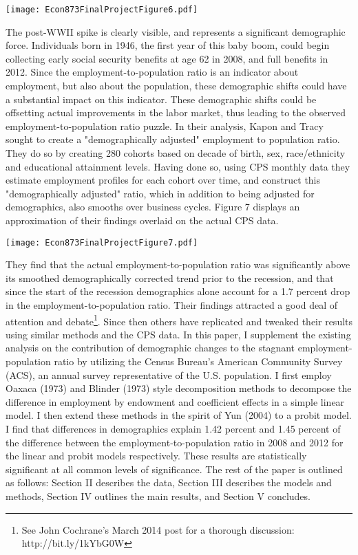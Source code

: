 \documentclass[11pt]{article}
\theoremstyle{definition}
\begin{document}
\begin{center}
\texttt{[image: Econ873FinalProjectFigure6.pdf]}
\end{center}

The post-WWII spike is clearly visible, and represents a significant demographic force.  Individuals born in 1946, the first year of this baby boom, could begin collecting early social security benefits at age 62 in 2008, and full benefits in 2012.  Since the employment-to-population ratio is an indicator about employment, but also about the population, these demographic shifts could have a substantial impact on this indicator.  These demographic shifts could be offsetting actual improvements in the labor market, thus leading to the observed employment-to-population ratio puzzle.  In their analysis, Kapon and Tracy sought to create a "demographically adjusted" employment to population ratio.  They do so by creating 280 cohorts based on decade of birth, sex, race/ethnicity and educational attainment levels.  Having done so, using CPS monthly data they estimate employment profiles for each cohort over time, and construct this "demographically adjusted" ratio, which in addition to being adjusted for demographics, also smooths over business cycles.  Figure 7 displays an approximation of their findings overlaid on the actual CPS data.  

\begin{center}
\texttt{[image: Econ873FinalProjectFigure7.pdf]}
\end{center}

They find that the actual employment-to-population ratio was significantly above its smoothed demographically corrected trend prior to the recession, and that since the start of the recession demographics alone account for a 1.7 percent drop in the employment-to-population ratio.  Their findings attracted a good deal of attention and debate\footnote{See John Cochrane's March 2014 post for a thorough discussion: http://bit.ly/1kYbG0W}.  Since then others have replicated and tweaked their results using similar methods and the CPS data.  In this paper, I supplement the existing analysis on the contribution of demographic changes to the stagnant employment-population ratio by utilizing the Census Bureau's American Community Survey (ACS), an annual survey representative of the U.S. population.  I first employ Oaxaca (1973) and Blinder (1973) style decomposition methods to decompose the difference in employment by endowment and coefficient effects in a simple linear model.  I then extend these methods in the spirit of Yun (2004) to a probit model.  I find that differences in demographics explain 1.42 percent and 1.45 percent of the difference between the employment-to-population ratio in 2008 and 2012 for the linear and probit models respectively.  These results are statistically significant at all common levels of significance.  The rest of the paper is outlined as follows: Section II describes the data, Section III describes the models and methods, Section IV outlines the main results, and Section V concludes.
\end{document}
